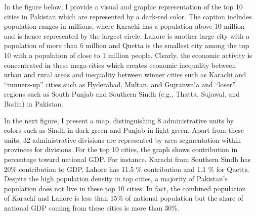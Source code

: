 \documentclass[12pt]{article}
\newcommand{\1}{\mathbbm 1}
\begin{document}
		
		
		In the figure below, I provide a visual and graphic representation of the top 10 cities in Pakistan which are represented by a dark-red color. The caption includes population ranges in millions, where Karachi has a population above 10 million and is hence represented by the largest circle. Lahore is another large city with a population of more than 6 million and Quetta is the smallest city among the top 10 with a population of close to 1 million people. Clearly, the economic activity is concentrated in these mega-cities which creates economic inequality between urban and rural areas and inequality between winner cities such as Karachi and ``runners-up'' cities such as Hyderabad, Multan, and Gujranwala and ``loser'' regions such as South Punjab and Southern Sindh (e.g., Thatta, Sujawal, and Badin) in Pakistan. 
		
		
		
		\begin{figure}[H]
			\centering
			\scalebox{1}{}
			\hfill
			\caption{}
		\end{figure}
		
		
		
		
		
		
		
		
		
		
	
		
		In the next figure, I present a map, distinguishing 8 administrative units by colors such as Sindh in dark green and Punjab in light green. Apart from these units, 32 administrative divisions are represented by area segmentation within provinces for divisions. For the top 10 cities, the graph shows contribution in percentage toward national GDP. For instance, Karachi from Southern Sindh has 20\% contribution to GDP, Lahore has 11.5 \% contribution and 1.1 \% for Quetta. Despite the high population density in top cities, a majority of Pakistan's population does not live in these top 10 cities. In fact, the combined population of Karachi and Lahore is less than 15\% of national population but the share of national GDP coming from these cities is more than 30\%. 
		
		
\end{document}
